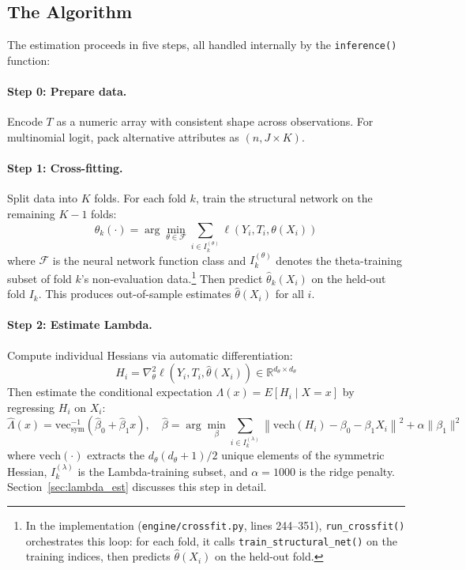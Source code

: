 \subsection{The Algorithm}

The estimation proceeds in five steps, all handled internally by the \texttt{inference()} function:

\paragraph{Step 0: Prepare data.} Encode $T$ as a numeric array with consistent shape across observations. For multinomial logit, pack alternative attributes as $(n, J \times K)$.

\paragraph{Step 1: Cross-fitting.} Split data into $K$ folds. For each fold $k$, train the structural network on the remaining $K-1$ folds:
\begin{equation}\label{eq:crossfit}
    \hat{\theta}_k(\cdot) = \arg\min_{\theta \in \mathcal{F}} \sum_{i \in I_k^{(\theta)}} \ell(Y_i, T_i, \theta(X_i))
\end{equation}
where $\mathcal{F}$ is the neural network function class and $I_k^{(\theta)}$ denotes the theta-training subset of fold $k$'s non-evaluation data.\footnote{In the implementation (\texttt{engine/crossfit.py}, lines 244--351), \texttt{run\_crossfit()} orchestrates this loop: for each fold, it calls \texttt{train\_structural\_net()} on the training indices, then predicts $\hat{\theta}(X_i)$ on the held-out fold.} Then predict $\hat{\theta}_k(X_i)$ on the held-out fold $I_k$. This produces out-of-sample estimates $\hat{\theta}(X_i)$ for all $i$.

\paragraph{Step 2: Estimate Lambda.} Compute individual Hessians via automatic differentiation:
\begin{equation}\label{eq:hessian_obs}
    H_i = \nabla_\theta^2 \ell(Y_i, T_i, \hat{\theta}(X_i)) \in \mathbb{R}^{d_\theta \times d_\theta}
\end{equation}
Then estimate the conditional expectation $\Lambda(x) = E[H_i \mid X = x]$ by regressing $H_i$ on $X_i$:
\begin{equation}\label{eq:lambda_ridge}
    \hat{\Lambda}(x) = \mathrm{vec}^{-1}_{\mathrm{sym}}\!\left(\hat{\beta}_0 + \hat{\beta}_1 x\right), \quad \hat{\beta} = \arg\min_\beta \sum_{i \in I_k^{(\lambda)}} \left\|\mathrm{vech}(H_i) - \beta_0 - \beta_1 X_i\right\|^2 + \alpha \|\beta_1\|^2
\end{equation}
where $\mathrm{vech}(\cdot)$ extracts the $d_\theta(d_\theta+1)/2$ unique elements of the symmetric Hessian, $I_k^{(\lambda)}$ is the Lambda-training subset, and $\alpha = 1000$ is the ridge penalty. Section~\ref{sec:lambda_est} discusses this step in detail.

